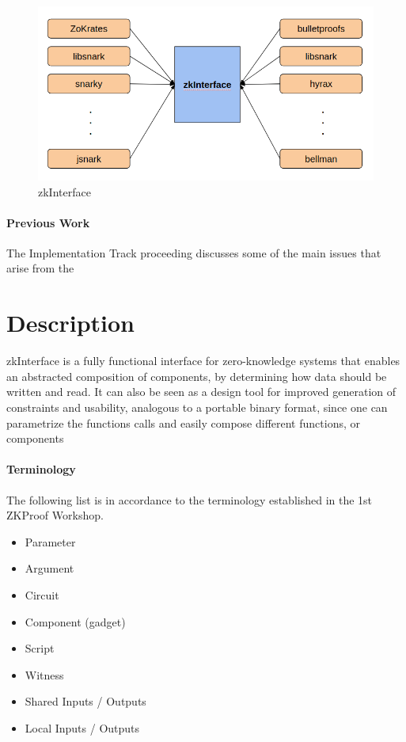\documentclass[a4paper,11pt]{article}
\begin{document}
	\begin{figure}[h!]
		\includegraphics[width=\linewidth]{interface.png}
		\caption{zkInterface}
		\label{interface}
	\end{figure}
	
	
	\paragraph{Previous Work}
	
	The Implementation Track proceeding discusses some of the main issues that arise from the 
	
	
	
	
	\section{Description}
	
	zkInterface is a fully functional interface for zero-knowledge systems that enables an abstracted composition of components, by determining how data should be written and read. It can also be seen as a design tool for improved generation of constraints and usability, analogous to a portable binary format, since one can parametrize the functions calls and easily compose different functions, or components
	
	
	
	\paragraph{Terminology}
	The following list is in accordance to the terminology established in the 1st ZKProof Workshop.
	
	\begin{itemize}
		\item Parameter
		\item Argument
		\item Circuit
		\item Component (gadget)
		\item Script
		\item Witness
		\item Shared Inputs / Outputs
		\item Local Inputs / Outputs
		
	\end{itemize}
	
\end{document}
